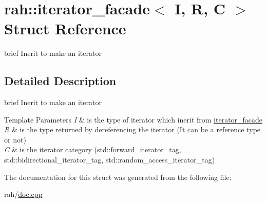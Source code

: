 \hypertarget{structrah_1_1iterator__facade_3_01_i_00_01_r_00_01_c_01_4}{}\section{rah\+::iterator\+\_\+facade$<$ I, R, C $>$ Struct Reference}
\label{structrah_1_1iterator__facade_3_01_i_00_01_r_00_01_c_01_4}


brief Inerit to make an iterator  




\subsection{Detailed Description}
brief Inerit to make an iterator 


\begin{DoxyTemplParams}{Template Parameters}
{\em I} & is the type of iterator which inerit from \mbox{\hyperlink{structrah_1_1iterator__facade}{iterator\+\_\+facade}} \\
\hline
{\em R} & is the type returned by dereferencing the iterator (It can be a reference type or not) \\
\hline
{\em C} & is the iterator category (std\+::forward\+\_\+iterator\+\_\+tag, std\+::bidirectional\+\_\+iterator\+\_\+tag, std\+::random\+\_\+access\+\_\+iterator\+\_\+tag) \\
\hline
\end{DoxyTemplParams}


The documentation for this struct was generated from the following file\+:\begin{DoxyCompactItemize}
\item 
rah/\mbox{\hyperlink{doc_8cpp}{doc.\+cpp}}\end{DoxyCompactItemize}
